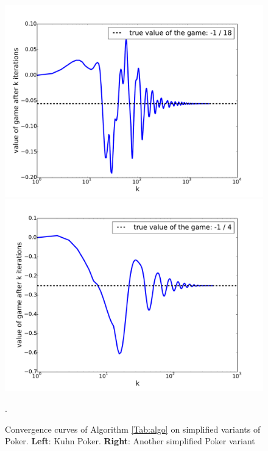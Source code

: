 \documentclass[a4paper,9pt,journal]{IEEEtran}
\newtheorem{remark}{Remark}
\begin{document}
\begin{figure}
  \includegraphics[width=.5\linewidth]{Kuhn3112_NE.pdf}
  \includegraphics[width=.5\linewidth]{SimplifiedPoker_NE.pdf}
  \caption{Convergence curves of Algorithm \ref{Tab:algo} on simplified variants of Poker. \textbf{Left}: Kuhn Poker. \textbf{Right}: Another simplified Poker variant}.
  \label{Tab:conv_curves}
\end{figure}




 
\end{document}
